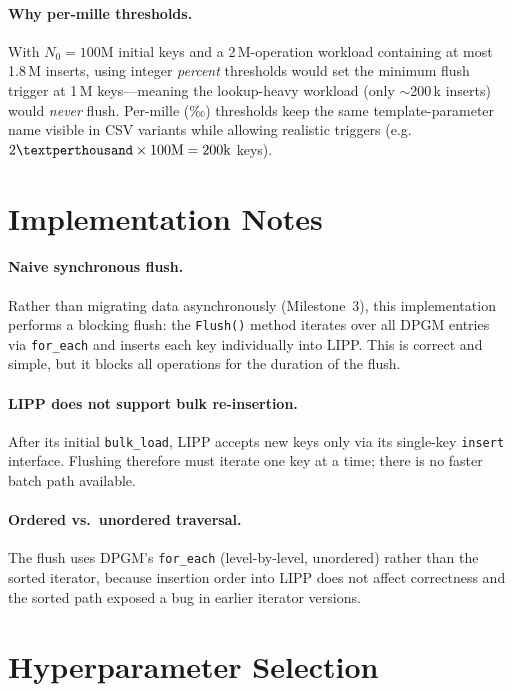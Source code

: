 \documentclass{MITcsail}
\newcommand{\permil}{\textperthousand}
\begin{document}
\paragraph{Why per-mille thresholds.}
With $N_0 = 100\text{M}$ initial keys and a 2\,M-operation workload
containing at most 1.8\,M inserts, using integer \emph{percent} thresholds
would set the minimum flush trigger at 1\,M keys---meaning the lookup-heavy
workload (only $\sim$200\,k inserts) would \emph{never} flush.  Per-mille
(‰) thresholds keep the same template-parameter name visible in CSV
variants while allowing realistic triggers (e.g.\ $2\permil \times 100\text{M}
= 200\text{k}$ keys).

\section{Implementation Notes}
\paragraph{Naive synchronous flush.}
Rather than migrating data asynchronously (Milestone~3), this implementation
performs a blocking flush: the \texttt{Flush()} method iterates over all
DPGM entries via \texttt{for\_each} and inserts each key individually into
LIPP.  This is correct and simple, but it blocks all operations for the
duration of the flush.

\paragraph{LIPP does not support bulk re-insertion.}
After its initial \texttt{bulk\_load}, LIPP accepts new keys only via its
single-key \texttt{insert} interface.  Flushing therefore must iterate one
key at a time; there is no faster batch path available.

\paragraph{Ordered vs.\ unordered traversal.}
The flush uses DPGM's \texttt{for\_each} (level-by-level, unordered)
rather than the sorted iterator, because insertion order into LIPP does not
affect correctness and the sorted path exposed a bug in earlier iterator
versions.

\section{Hyperparameter Selection}
\end{document}
